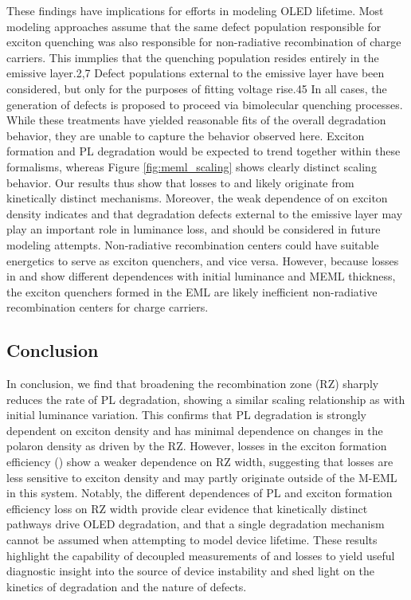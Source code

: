\documentclass[../thesis.tex]{subfiles}
\begin{document}
These findings have implications for efforts in modeling OLED lifetime. 
Most modeling approaches assume that the same defect population responsible for exciton quenching was also responsible for non-radiative recombination of charge carriers. 
This immplies that the quenching population resides entirely in the emissive layer.2,7 \supercite{Giebink2008a,Zhang2014}
Defect populations external to the emissive layer have been considered, but only for the purposes of fitting voltage rise.45 \supercite{Lee2017}
In all cases, the generation of defects is proposed to proceed via bimolecular quenching processes.
While these treatments have yielded reasonable fits of the overall degradation behavior, they are unable to capture the behavior observed here.
Exciton formation and PL degradation would be expected to trend together within these formalisms, whereas Figure \ref{fig:meml_scaling} shows clearly distinct scaling behavior. 
Our results thus show that losses to \pl and \ef likely originate from kinetically distinct mechanisms.  
Moreover, the weak dependence of \ef on exciton density indicates and that degradation defects external to the emissive layer may play an important role in luminance loss, and should be considered in future modeling attempts.
Non-radiative recombination centers could have suitable energetics to serve as exciton quenchers, and vice versa.
However, because losses in \ef and \pl show different dependences with initial luminance and MEML thickness, the exciton quenchers formed in the EML are likely inefficient non-radiative recombination centers for charge carriers.

\subsection{Conclusion}

In conclusion, we find that broadening the recombination zone (RZ) sharply reduces the rate of PL degradation, showing a similar scaling relationship as with initial luminance variation. 
This confirms that PL degradation is strongly dependent on exciton density and has minimal dependence on changes in the polaron density as driven by the RZ.  
However, losses in the exciton formation efficiency (\ef) show a weaker dependence on RZ width, suggesting that \ef losses are less sensitive to exciton density and may partly originate outside of the M-EML in this system. 
Notably, the different dependences of PL and exciton formation efficiency loss on RZ width provide clear evidence that kinetically distinct pathways drive OLED degradation, and that a single degradation mechanism cannot be assumed when attempting to model device lifetime. 
These results highlight the capability of decoupled measurements of \pl and \ef losses to yield useful diagnostic insight into the source of device instability and shed light on the kinetics of degradation and the nature of defects.
\end{document}

